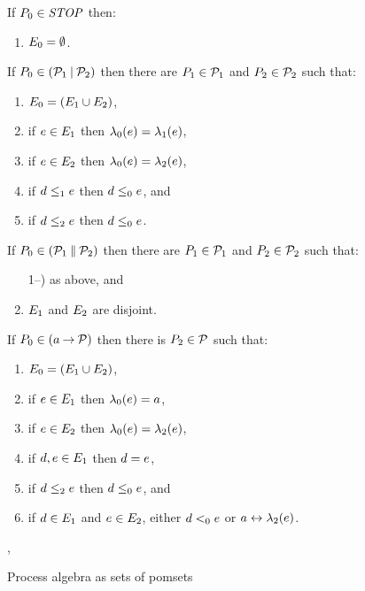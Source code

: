\begin{figure*}
  If $P_0\in\mathit{STOP}$ then:
  \begin{enumerate}
    \item $E_0 = \emptyset$.
  \end{enumerate}
  If $P_0 \in (\mathcal{P}_1\mathbin{\mid}\mathcal{P}_2)$ then
  there are $P_1\in\mathcal{P}_1$ and $P_2\in\mathcal{P}_2$ such that:
  \begin{enumerate}
  \item $E_0 = (E_1\cup E_2)$,
  \item if $e\in E_1$ then $\lambda_0(e) = \lambda_1(e)$, 
  \item if $e\in E_2$ then $\lambda_0(e) = \lambda_2(e)$,
  \item if $d\le_1e$ then $d\le_0e$, and
  \item if $d\le_2e$ then $d\le_0e$.
    \setcounter{pomsetParCount}{\value{enumi}}
  \end{enumerate}
  If $P_0 \in (\mathcal{P}_1\mathbin{\parallel}\mathcal{P}_2)$ then
  there are $P_1\in\mathcal{P}_1$ and $P_2\in\mathcal{P}_2$ such that:
  \begin{enumerate}
        \setcounter{enumi}{\value{pomsetParCount}}
  \item[1--\thepomsetParCount)] as above, and
  \item $E_1$ and $E_2$ are disjoint.
  \end{enumerate}
  If $P_0 \in (a\mathbin{\rightarrow}\mathcal{P})$ then there is $P_2\in\mathcal{P}$ such that:
  \begin{enumerate}
  \item $E_0=(E_1 \cup E_2)$,
  \item if $e\in E_1$ then $\lambda_0(e) = a$,
  \item if $e\in E_2$ then $\lambda_0(e) = \lambda_2(e)$,
  \item if $d,e\in E_1$ then $d=e$,
  \item if $d\le_2e$ then $d\le_0e$, and
    \setcounter{pomsetPrefixCount}{\value{enumi}}
  \item if $d\in E_1$ and $e\in E_2$, either $d<_0e$ or $a\mathrel\leftrightarrow\lambda_2(e)$.
  \end{enumerate}
\caption{Process algebra as sets of pomsets}
\label{tab:pomsets},
\end{figure*}

